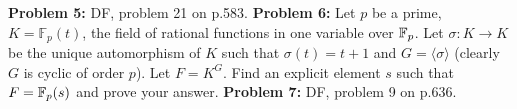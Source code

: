 \documentclass[12pt]{article}
\begin{document}
\skv
{\bf Problem 5:} DF, problem 21 on p.583.
\skv
{\bf Problem 6:} Let $p$ be a prime, $K=\mathbb F_p(t)$, the field of rational functions in one variable over ${\mathbb F}_p$.
Let $\sigma:K\to K$ be the unique automorphism of $K$ such that $\sigma(t)=t+1$ and $G=\langle \sigma\rangle$ (clearly
$G$ is cyclic of order $p$). Let $F=K^G$. Find an explicit element $s$ such that $F={\mathbb F}_p(s)$ and prove your answer.
\skv
{\bf Problem 7:} DF, problem 9 on p.636.
\skv
\end{document}
